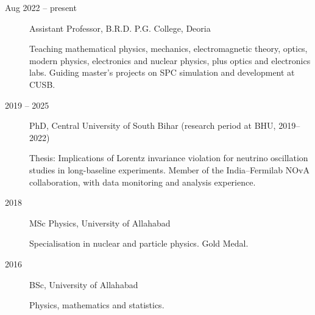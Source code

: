 \begin{description}

\item[Aug 2022 -- present]
Assistant Professor, B.R.D. P.G. College, Deoria

Teaching mathematical physics, mechanics, electromagnetic theory, optics, modern physics, electronics and nuclear physics, plus optics and electronics labs. Guiding master's projects on SPC simulation and development at CUSB.

\item[2019 -- 2025]
PhD, Central University of South Bihar (research period at BHU, 2019--2022)

Thesis: Implications of Lorentz invariance violation for neutrino oscillation studies in long-baseline experiments. Member of the India--Fermilab NOvA collaboration, with data monitoring and analysis experience.

\item[2018]
MSc Physics, University of Allahabad

Specialisation in nuclear and particle physics. Gold Medal.

\item[2016]
BSc, University of Allahabad

Physics, mathematics and statistics.

\end{description}
